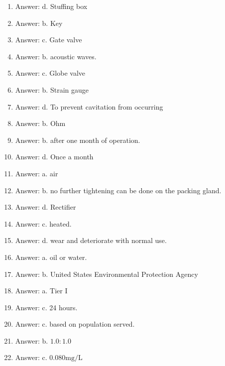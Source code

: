 \documentclass[10pt]{article}
\begin{document}
\begin{enumerate}
  \item Answer: d. Stuffing box

  \item Answer: b. Key

  \item Answer: c. Gate valve

  \item Answer: b. acoustic waves.

  \item Answer: c. Globe valve

  \item Answer: b. Strain gauge

  \item Answer: d. To prevent cavitation from occurring

  \item Answer: b. Ohm

  \item Answer: b. after one month of operation.

  \item Answer: d. Once a month

  \item Answer: a. air

  \item Answer: b. no further tightening can be done on the packing gland.

  \item Answer: d. Rectifier

  \item Answer: c. heated.

  \item Answer: d. wear and deteriorate with normal use.

  \item Answer: a. oil or water.

  \item Answer: b. United States Environmental Protection Agency

  \item Answer: a. Tier I

  \item Answer: c. 24 hours.

  \item Answer: c. based on population served.

  \item Answer: b. $1.0: 1.0$

  \item Answer: c. $0.080 \mathrm{mg} / \mathrm{L}$


\end{enumerate}
\end{document}
